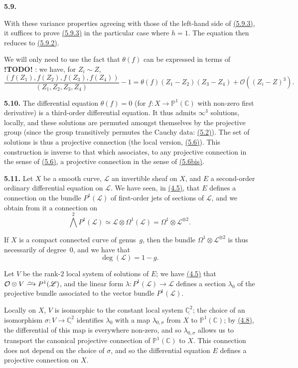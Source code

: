 \documentclass{report}
\newenvironment{rmenv}[1]
  {\phantomsection\par\medskip\noindent\textbf{#1.}\rmfamily}
  {\medskip}
\newcommand{\scr}[1]{{\mathscr{#1}}}
\renewcommand{\cal}[1]{{\mathcal{#1}}}
\newcommand{\PP}{\mathbb{P}}
\newcommand{\CC}{\mathbb{C}}
\newcommand{\simto}{\xrightarrow{\raisebox{-0.7ex}[0ex][0ex]{$\sim$}}}
\newcommand{\todo}{\textbf{ !TODO! }}
\newcommand{\oldpage}[1]{\marginpar{\footnotesize$\Big\vert$ \textit{p.~#1}}}
\begin{document}
\begin{rmenv}{5.9}
\begin{enumerate}[(i)]
      With these variance properties agreeing with those of the left-hand side of \hyperref[I.5.9.3]{(5.9.3)}, it suffices to prove \hyperref[I.5.9.3]{(5.9.3)} in the particular case where $h=1$.
      The equation then reduces to \hyperref[I.5.9.2]{(5.9.2)}.
  \end{enumerate}

  We will only need to use the fact that $\theta(f)$ can be expressed in terms of \todo:
  we have, for $Z_i\sim Z$,
  \[
  \label{I.5.9.4}
    \frac{(f(Z_1),f(Z_2),f(Z_3),f(Z_4))}{(Z_1,Z_2,Z_3,Z_4)} - 1
    = \theta(f)(Z_1-Z_2)(Z_3-Z_4) + \mathcal{O}((Z_i-Z)^3).
  \tag{5.9.4}
  \]
\end{rmenv}

\oldpage{35}
\begin{rmenv}{5.10}
\label{I.5.10}
  The differential equation $\theta(f)=0$ (for $f\colon X\to\PP^1(\CC)$ with non-zero first derivative) is a third-order differential equation.
  It thus admits $\infty^3$ solutions, locally, and these solutions are permuted amongst themselves by the projective group (since the group transitively permutes the Cauchy data: \hyperref[I.5.2]{(5.2)}).
  The set of solutions is thus a projective connection (the local version, \hyperref[I.5.6]{(5.6)}).
  This construction is inverse to that which associates, to any projective connection in the sense of \hyperref[I.5.6]{(5.6)}, a projective connection in the sense of \hyperref[I.5.6bis]{(5.6bis)}.
\end{rmenv}

\begin{rmenv}{5.11}
\label{I.5.11}
  Let $X$ be a smooth curve, $\scr{L}$ an invertible sheaf on $X$, and $E$ a second-order ordinary differential equation on $\scr{L}$.
  We have seen, in \hyperref[I.4.5]{(4.5)}, that $E$ defines a connection on the bundle $P^1(\scr{L})$ of first-order jets of sections of $\scr{L}$, and we obtain from it a connection on
  \[
    \bigwedge^2 P^1(\scr{L}) \simeq \scr{L}\otimes\Omega^1(\scr{L}) = \Omega^1\otimes\scr{L}^{\otimes2}.
  \]

  If $X$ is a compact connected curve of genus~$g$, then the bundle $\Omega^1\otimes\scr{L}^{\otimes2}$ is thus necessarily of degree~$0$, and we have that
  \[
    \deg(\scr{L}) = 1-g.
  \]

  Let $V$ be the rank-$2$ local system of solutions of $E$;
  we have \hyperref[I.4.5]{(4.5)} that $\cal{O}\otimes V\simto P^1(\scr{L})$, and the linear form $\lambda\colon P^1(\scr{L})\to\scr{L}$ defines a section $\lambda_0$ of the projective bundle associated to the vector bundle $P^1(\scr{L})$.

  Locally on $X$, $V$ is isomorphic to the constant local system $\underline{\CC^2}$;
  the choice of an isomorphism $\sigma\colon V\to\underline{\CC^2}$ identifies $\lambda_0$ with a map $\lambda_{0,\sigma}$ from $X$ to $\PP^1(\CC)$;
  by \hyperref[I.4.8]{(4.8)}, the differential of this map is everywhere non-zero, and so $\lambda_{0,\sigma}$ allows us to transport the canonical projective connection of $\PP^1(\CC)$ to $X$.
  This connection does not depend on the choice of $\sigma$, and so the differential equation $E$ defines a projective connection on $X$.
\end{rmenv}
\end{document}
